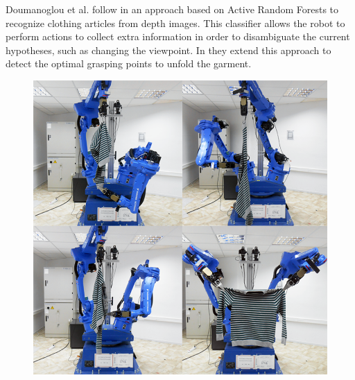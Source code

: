 Doumanoglou et al. follow in \cite{Doumanoglou2014ECCV} an approach based on Active Random Forests to recognize clothing articles from depth images. This classifier allows the robot to perform actions to collect extra information in order to disambiguate the current hypotheses, such as changing the viewpoint. In \cite{Doumanoglou2014ICRA} they extend this approach to detect the optimal grasping points to unfold the garment.


\begin{figure}[thpb]
    \centering
    \includegraphics[width=0.9
    \textwidth]{figures/SOTA_Doumanoglou_2014.png}
    \caption{}
    \label{fig:SOTA_Doumanoglou_2014}
\end{figure}


